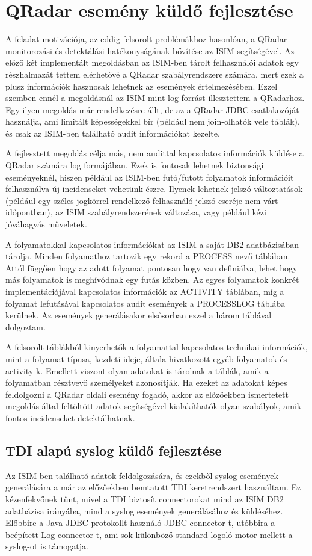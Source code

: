 \section{QRadar esemény küldő fejlesztése}
A feladat motivációja, az eddig felsorolt problémákhoz hasonlóan, a QRadar monitorozási és detektálási hatékonyságának bővítése az ISIM segítségével. Az előző két implementált megoldásban az ISIM-ben tárolt felhasználói adatok egy részhalmazát tettem elérhetővé a QRadar szabályrendszere számára, mert ezek a plusz információk hasznosak lehetnek az események értelmezésében. Ezzel szemben ennél a megoldásnál az ISIM mint log forrást illesztettem a QRadarhoz. Egy ilyen megoldás már rendelkezésre állt, de az a QRadar JDBC csatlakozóját használja, ami limitált képességekkel bír (például nem join-olhatók vele táblák), és csak az ISIM-ben található audit információkat kezelte.

A fejlesztett megoldás célja más, nem audittal kapcsolatos információk küldése a QRadar számára log formájában. Ezek is fontosak lehetnek biztonsági eseményeknél, hiszen például az ISIM-ben futó/futott folyamatok információit felhasználva új incidenseket vehetünk észre. Ilyenek lehetnek jelszó változtatások (például egy széles jogkörrel rendelkező felhasználó jelszó cseréje nem várt időpontban), az ISIM szabályrendszerének változása, vagy például kézi jóváhagyás műveletek. 

A folyamatokkal kapcsolatos információkat az ISIM a saját DB2 adatbázisában tárolja. Minden folyamathoz tartozik egy rekord a PROCESS nevű táblában. Attól függően hogy az adott folyamat pontosan hogy van definiálva, lehet hogy más folyamatok is meghívódnak egy futás közben. Az egyes folyamatok konkrét implementációjával kapcsolatos információk az ACTIVITY táblában, míg a folyamat lefutásával kapcsolatos audit események a PROCESSLOG táblába kerülnek. Az események generálásakor elsősorban ezzel a három táblával dolgoztam.

A felsorolt táblákból kinyerhetők a folyamattal kapcsolatos technikai információk, mint a folyamat típusa, kezdeti ideje, általa hivatkozott egyéb folyamatok és activity-k. Emellett viszont olyan adatokat is tárolnak a táblák, amik a folyamatban résztvevő személyeket azonosítják. Ha ezeket az adatokat képes feldolgozni a QRadar oldali esemény fogadó, akkor az előzőekben ismertetett megoldás által feltöltött adatok segítségével kialakíthatók olyan szabályok, amik fontos incidenseket detektálhatnak.
 
\subsection{TDI alapú syslog küldő fejlesztése}
Az ISIM-ben található adatok feldolgozására, és ezekből syslog események generálására a már az előzőekben bemtatott TDI keretrendszert használtam. Ez kézenfekvőnek tűnt, mivel a TDI biztosít connectorokat mind az ISIM DB2 adatbázisa irányába, mind a syslog események generálásához és küldéséhez. Előbbire a Java JDBC protokollt használó JDBC connector-t, utóbbira a beépített Log connector-t, ami sok különböző standard logoló motor mellett a syslog-ot is támogatja. 

